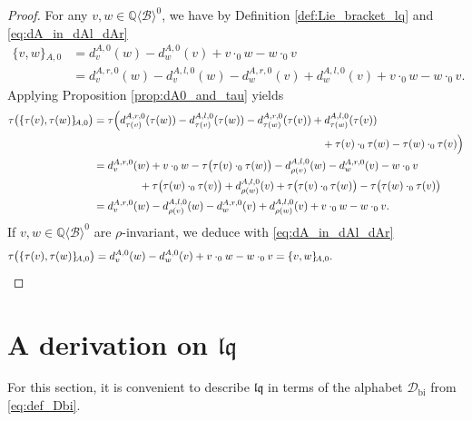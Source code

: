 \documentclass[12pt,reqno]{amsart}
\numberwithin{equation}{section}
\theoremstyle{definition}
\newcommand{\QQ}{\mathbb{Q}}
\newcommand{\B}{\mathcal{B}}
\newcommand{\QB}{\QQ\langle \B\rangle}
\newcommand{\Dbi}{\mathcal{D}_{\operatorname{bi}}}
\newcommand{\lqq}{\mathfrak{lq}}
\newcommand{\arizero}[2]{\{#1,#2\}\!_{A,0}}
\newcommand{\derzero}[1]{d_{#1}^{A,0}}
\newcommand{\derrzero}[1]{d_{#1}^{A,r,0}}
\newcommand{\derlzero}[1]{d_{#1}^{A,l,0}}
\newcommand{\conczero}{\cdot_0}
\begin{document}
\begin{proof} For any $v,w\in \QB^0$, we have by Definition \ref{def:Lie_bracket_lq} and \eqref{eq:dA_in_dAl_dAr}
\begin{align*}
\arizero{v}{w}&=\derzero{v}(w)-\derzero{w}(v)+v\conczero w - w\conczero v \\ &=\derrzero{v}(w)-\derlzero{v}(w)-\derrzero{w}(v)+\derlzero{w}(v)+v\conczero w - w\conczero v.
\end{align*}
Applying Proposition \ref{prop:dA0_and_tau} yields
\begin{align*}
\tau\big(\arizero{\tau(v)}{\tau(w)}\big)&=\tau\Big(\derrzero{\tau(v)}(\tau(w))-\derlzero{\tau(v)}(\tau(w))-\derrzero{\tau(w)}(\tau(v))+\derlzero{\tau(w)}(\tau(v)) \\
&\hspace{7.5cm}+\tau(v)\conczero \tau(w) - \tau(w)\conczero \tau(v)\Big)\\
&=\derrzero{v}(w)+v\conczero w-\tau\big(\tau(v)\conczero\tau(w)\big)-\derlzero{\rho(v)}(w)-\derrzero{w}(v)-w\conczero v \\
&\hspace{1.5cm}+\tau\big(\tau(w)\conczero\tau(v)\big)+\derlzero{\rho(w)}(v)+\tau\big(\tau(v)\conczero \tau(w)\big) - \tau\big(\tau(w)\conczero \tau(v)\big) \\
&=\derrzero{v}(w)-\derlzero{\rho(v)}(w)-\derrzero{w}(v)+\derlzero{\rho(w)}(v)+v\conczero w-w\conczero v.
\end{align*}
If $v,w\in \QB^0$ are $\rho$-invariant, we deduce with \eqref{eq:dA_in_dAl_dAr}
\begin{align*}
\tau\big(\arizero{\tau(v)}{\tau(w)}\big)=\derzero{v}(w)-\derzero{w}(v)+v\conczero w-w\conczero v=\arizero{v}{w}.\hspace{4.2cm}
\qedhere\end{align*}
\end{proof}


\section{A derivation on $\lqq$} \label{sec:deriv_on_lq}

For this section, it is convenient to describe $\lqq$ in terms of the alphabet $\Dbi$ from \eqref{eq:def_Dbi}.
\end{document}
